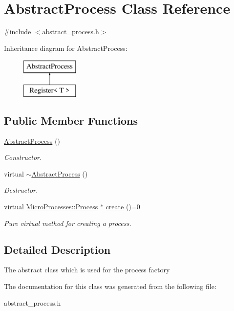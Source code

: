 \hypertarget{classAbstractProcess}{}\section{Abstract\+Process Class Reference}
\label{classAbstractProcess}


{\ttfamily \#include $<$abstract\+\_\+process.\+h$>$}

Inheritance diagram for Abstract\+Process\+:\begin{figure}[H]
\begin{center}
\leavevmode
\includegraphics[height=2.000000cm]{classAbstractProcess}
\end{center}
\end{figure}
\subsection*{Public Member Functions}
\begin{DoxyCompactItemize}
\item 
\mbox{\label{classAbstractProcess_aca866d43e7fe7c162c49a216f6393a4d}} 
\mbox{\hyperlink{classAbstractProcess_aca866d43e7fe7c162c49a216f6393a4d}{Abstract\+Process}} ()
\begin{DoxyCompactList}\small\item\em Constructor. \end{DoxyCompactList}\item 
\mbox{\label{classAbstractProcess_a9ae2142671945c6d92724d2daa5172cb}} 
virtual \mbox{\hyperlink{classAbstractProcess_a9ae2142671945c6d92724d2daa5172cb}{$\sim$\+Abstract\+Process}} ()
\begin{DoxyCompactList}\small\item\em Destructor. \end{DoxyCompactList}\item 
\mbox{\label{classAbstractProcess_a8774aa41d5859b559b78e89cc48a65f0}} 
virtual \mbox{\hyperlink{classMicroProcesses_1_1Process}{Micro\+Processes\+::\+Process}} $\ast$ \mbox{\hyperlink{classAbstractProcess_a8774aa41d5859b559b78e89cc48a65f0}{create}} ()=0
\begin{DoxyCompactList}\small\item\em Pure virtual method for creating a process. \end{DoxyCompactList}\end{DoxyCompactItemize}


\subsection{Detailed Description}
The abstract class which is used for the process factory 

The documentation for this class was generated from the following file\+:\begin{DoxyCompactItemize}
\item 
abstract\+\_\+process.\+h\end{DoxyCompactItemize}
